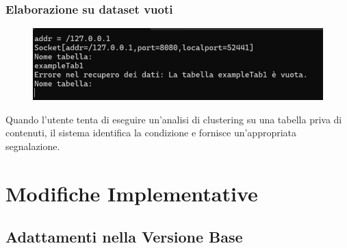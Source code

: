 \subsubsection{Elaborazione su dataset vuoti} 
    \begin{figure}[h!]
        \centering
        \includegraphics[width=\textwidth]{images/dataset_vuoti.png}
    \end{figure}

Quando l'utente tenta di eseguire un'analisi di clustering su una tabella priva di contenuti, il sistema identifica la condizione e fornisce un'appropriata segnalazione.


\section{Modifiche Implementative}
\subsection{Adattamenti nella Versione Base}
